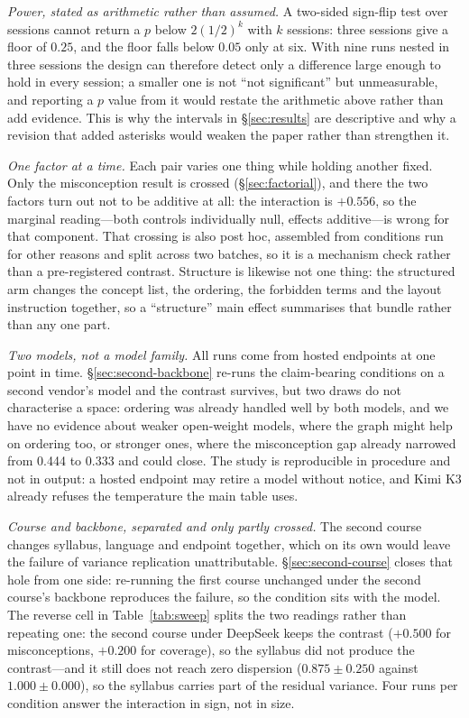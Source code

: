 \documentclass[review,12pt]{elsarticle}
\renewcommand{\_}{\kgunderscore\allowbreak}
\begin{document}
\emph{Power, stated as arithmetic rather than assumed.} A two-sided sign-flip
test over sessions cannot return a $p$ below $2(1/2)^k$ with $k$ sessions: three
sessions give a floor of $0.25$, and the floor falls below $0.05$ only at six.
With nine runs nested in three sessions the design can therefore detect only a
difference large enough to hold in every session; a smaller one is not
``not significant'' but unmeasurable, and reporting a $p$ value from it would
restate the arithmetic above rather than add evidence. This is why the intervals
in \S\ref{sec:results} are descriptive and why a revision that added asterisks
would weaken the paper rather than strengthen it.

\emph{One factor at a time.} Each pair varies one thing while holding another
fixed. Only the misconception result is crossed (\S\ref{sec:factorial}), and there
the two factors turn out not to be additive at all: the interaction is $+0.556$,
so the marginal reading---both controls individually null, effects additive---is
wrong for that component. That crossing is also post hoc, assembled from
conditions run for other reasons and split across two batches, so it is a
mechanism check rather than a pre-registered contrast. Structure is likewise not
one thing: the structured arm changes the concept list, the ordering, the
forbidden terms and the layout instruction together, so a ``structure'' main
effect summarises that bundle rather than any one part.

\emph{Two models, not a model family.} All runs come from hosted endpoints at
one point in time. \S\ref{sec:second-backbone} re-runs the claim-bearing
conditions on a second vendor's model and the contrast survives, but two draws
do not characterise a space: ordering was already handled well by both models,
and we have no evidence about weaker open-weight models, where the graph might
help on ordering too, or stronger ones, where the misconception gap already
narrowed from 0.444 to 0.333 and could close. The study is reproducible in
procedure and not in output: a hosted endpoint may retire a model without
notice, and Kimi K3 already refuses the temperature the main table uses.

\emph{Course and backbone, separated and only partly crossed.} The second course
changes syllabus, language and endpoint together, which on its own would leave the
failure of variance replication unattributable. \S\ref{sec:second-course} closes
that hole from one side: re-running the first course unchanged under the second
course's backbone reproduces the failure, so the condition sits with the model.
The reverse cell in Table~\ref{tab:sweep} splits the two readings rather than
repeating one: the second course under DeepSeek keeps the contrast ($+0.500$ for
misconceptions, $+0.200$ for coverage), so the syllabus did not produce the
contrast---and it still does not reach zero dispersion ($0.875 \pm 0.250$ against
$1.000 \pm 0.000$), so the syllabus carries part of the residual variance. Four
runs per condition answer the interaction in sign, not in size.
\end{document}
